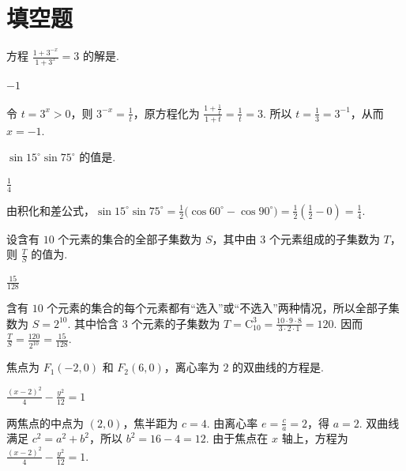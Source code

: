 \documentclass[UTF8,a4paper,oneside,11pt]{ctexbook}
\begin{document}
\section{填空题}

\begin{problem}
方程 \(\frac{1+3^{-x}}{1+3^x}=3\) 的解是\fillinblank{}.

\begin{answer}
\(-1\)
\end{answer}

\begin{solution}
令 \(t=3^x>0\)，则 \(3^{-x}=\frac{1}{t}\)，原方程化为 \(\frac{1+\frac{1}{t}}{1+t}=\frac{1}{t}=3\). 所以 \(t=\frac{1}{3}=3^{-1}\)，从而 \(x=-1\).
\end{solution}
\end{problem}

\begin{problem}
\(\sin 15^{\circ}\sin 75^{\circ}\) 的值是\fillinblank{}.

\begin{answer}
\(\frac{1}{4}\)
\end{answer}

\begin{solution}
由积化和差公式，\(\sin15^{\circ}\sin75^{\circ}=\frac{1}{2}\bigl(\cos60^{\circ}-\cos90^{\circ}\bigr)=\frac{1}{2}\left(\frac{1}{2}-0\right)=\frac{1}{4}\).
\end{solution}
\end{problem}

\begin{problem}
设含有 \(10\) 个元素的集合的全部子集数为 \(S\)，其中由 \(3\) 个元素组成的子集数为 \(T\)，则 \(\frac{T}{S}\) 的值为\fillinblank{}.

\begin{answer}
\(\frac{15}{128}\)
\end{answer}

\begin{solution}
含有 \(10\) 个元素的集合的每个元素都有“选入”或“不选入”两种情况，所以全部子集数为 \(S=2^{10}\). 其中恰含 \(3\) 个元素的子集数为 \(T=\mathrm C_{10}^{3}=\frac{10\cdot9\cdot8}{3\cdot2\cdot1}=120\). 因而 \(\frac{T}{S}=\frac{120}{2^{10}}=\frac{15}{128}\).
\end{solution}
\end{problem}

\begin{problem}
焦点为 \(F_1(-2,0)\) 和 \(F_2(6,0)\)，离心率为 \(2\) 的双曲线的方程是\fillinblank{}.

\begin{answer}
\(\frac{(x-2)^2}{4}-\frac{y^2}{12}=1\)
\end{answer}

\begin{solution}
两焦点的中点为 \((2,0)\)，焦半距为 \(c=4\). 由离心率 \(e=\frac{c}{a}=2\)，得 \(a=2\). 双曲线满足 \(c^2=a^2+b^2\)，所以 \(b^2=16-4=12\). 由于焦点在 \(x\) 轴上，方程为 \(\frac{(x-2)^2}{4}-\frac{y^2}{12}=1\).
\end{solution}
\end{problem}
\end{document}
